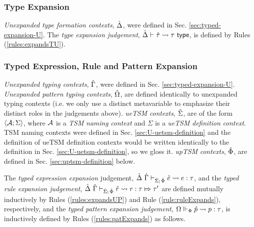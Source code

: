 {{{{\subsubsection{Type Expansion}
\emph{Unexpanded type formation contexts}, $\hat{\Delta}$, were defined in Sec. \ref{sec:typed-expansion-U}. The \emph{type expansion judgement}, $\hat{\Delta} \vdash {\hat\tau} \leadsto \tau~\mathsf{type}$, is defined by Rules (\ref{rules:expandsTU}).

\subsubsection{Typed Expression, Rule and Pattern Expansion}
\emph{Unexpanded typing contexts}, $\hat{\Gamma}$, were defined in Sec. \ref{sec:typed-expansion-U}. \emph{Unexpanded pattern typing contexts}, $\hat\Omega$, are defined identically to unexpanded typing contexts (i.e. we only use a distinct metavariable to emphasize their distinct roles in the judgements above). \emph{ueTSM contexts}, $\hat{\Sigma}$, are of the form $\langle \mathcal{A}; \Sigma \rangle$, where $\mathcal{A}$ is a \emph{TSM naming context} and $\Sigma$ is a \emph{ueTSM definition context}. TSM naming contexts were defined in Sec. \ref{sec:U-uetsm-definition} and the definition of ueTSM definition contexts would be written identically to the definition in Sec. \ref{sec:U-uetsm-definition}, so we gloss it. \emph{upTSM contexts}, $\hat\Phi$, are defined in Sec. \ref{sec:uptsm-definition} below.

The \emph{typed expression expansion} judgement, $\hat{\Delta}~\hat{\Gamma} \vdash_{\hat{\Sigma};\,\hat\Phi} {\hat e} \leadsto e : \tau$, and the \emph{typed rule expansion judgement}, $\hat{\Delta}~\hat{\Gamma} \vdash_{\hat{\Sigma};\,\hat\Phi} \hat{r} \leadsto r : \tau \Mapsto \tau'$ are defined mutually inductively by Rules (\ref*{rules:expandsUP}) and Rule (\ref*{rule:ruleExpands}), respectively, and the \emph{typed pattern expansion judgement}, $\Omega \Vdash_{\Phi} \hat{p} \leadsto p : \tau$, is inductively defined by Rules (\ref*{rules:patExpands}) as follows.

}}}}
